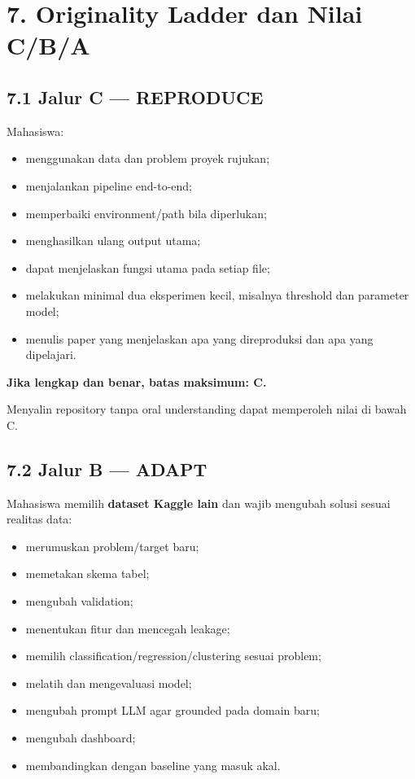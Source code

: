 \documentclass[
  indonesian,
  letterpaper,
  DIV=11,
  numbers=noendperiod]{scrreprt}
\providecommand{\tightlist}{%
  \setlength{\itemsep}{0pt}\setlength{\parskip}{0pt}}
\begin{document}

\chapter{7. Originality Ladder dan Nilai
C/B/A}\label{originality-ladder-dan-nilai-cba}

\section{7.1 Jalur C --- REPRODUCE}\label{jalur-c-reproduce}

Mahasiswa:

\begin{itemize}
\tightlist
\item
  menggunakan data dan problem proyek rujukan;
\item
  menjalankan pipeline end-to-end;
\item
  memperbaiki environment/path bila diperlukan;
\item
  menghasilkan ulang output utama;
\item
  dapat menjelaskan fungsi utama pada setiap file;
\item
  melakukan minimal dua eksperimen kecil, misalnya threshold dan
  parameter model;
\item
  menulis paper yang menjelaskan apa yang direproduksi dan apa yang
  dipelajari.
\end{itemize}

\textbf{Jika lengkap dan benar, batas maksimum: C.}

Menyalin repository tanpa oral understanding dapat memperoleh nilai di
bawah C.

\section{7.2 Jalur B --- ADAPT}\label{jalur-b-adapt}

Mahasiswa memilih \textbf{dataset Kaggle lain} dan wajib mengubah solusi
sesuai realitas data:

\begin{itemize}
\tightlist
\item
  merumuskan problem/target baru;
\item
  memetakan skema tabel;
\item
  mengubah validation;
\item
  menentukan fitur dan mencegah leakage;
\item
  memilih classification/regression/clustering sesuai problem;
\item
  melatih dan mengevaluasi model;
\item
  mengubah prompt LLM agar grounded pada domain baru;
\item
  mengubah dashboard;
\item
  membandingkan dengan baseline yang masuk akal.
\end{itemize}
\end{document}
